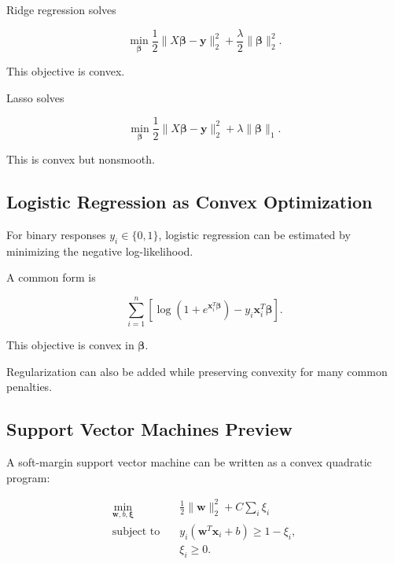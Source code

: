 Ridge regression solves

\[
\boxed{
\min_{\boldsymbol{\beta}}
\frac12
\|
X\boldsymbol{\beta}-\mathbf{y}
\|_2^2
+
\frac{\lambda}{2}
\|
\boldsymbol{\beta}
\|_2^2.
}
\]

This objective is convex.

Lasso solves

\[
\boxed{
\min_{\boldsymbol{\beta}}
\frac12
\|
X\boldsymbol{\beta}-\mathbf{y}
\|_2^2
+
\lambda
\|
\boldsymbol{\beta}
\|_1.
}
\]

This is convex but nonsmooth.

\subsection{Logistic Regression as Convex Optimization}
\label{subsec:logistic-regression-convex}

For binary responses \(y_i\in\{0,1\}\), logistic regression can be
estimated by minimizing the negative log-likelihood.

A common form is

\[
\boxed{
\sum_{i=1}^{n}
\left[
\log
\left(
1+e^{\mathbf{x}_i^T\boldsymbol{\beta}}
\right)
-
y_i
\mathbf{x}_i^T\boldsymbol{\beta}
\right].
}
\]

This objective is convex in \(\boldsymbol{\beta}\).

Regularization can also be added while preserving convexity for many
common penalties.

\subsection{Support Vector Machines Preview}
\label{subsec:svm-convex-preview}

A soft-margin support vector machine can be written as a convex quadratic
program:

\[
\boxed{
\begin{aligned}
\min_{\mathbf{w},b,\boldsymbol{\xi}}
\quad&
\frac12
\|\mathbf{w}\|_2^2
+
C
\sum_i
\xi_i
\\
\text{subject to}
\quad&
y_i
(
\mathbf{w}^T\mathbf{x}_i+b
)
\geq
1-\xi_i,
\\
&
\xi_i\geq0.
\end{aligned}
}
\]

